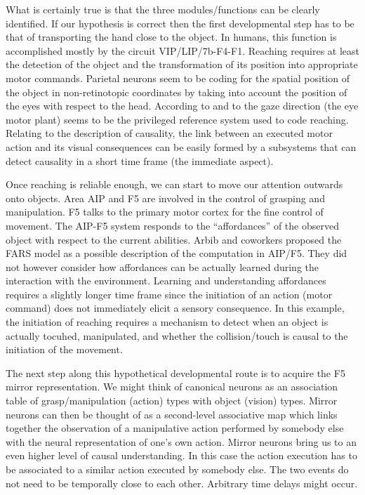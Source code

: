 What is certainly true is that the three modules/functions can be 
clearly identified. If our hypothesis is correct then 
the first developmental step has to be that of transporting the hand 
close to the object. In humans, this function is accomplished mostly by the
circuit VIP/LIP/7b-F4-F1. Reaching requires at least the detection of
the object and the transformation of its position into appropriate 
motor commands. Parietal neurons seem to be coding for the spatial
position of the object in non-retinotopic coordinates by taking
into account the position of the eyes with respect to the head. 
According to \cite{pouget-ducom-torri-bavelier-2002} and 
to \cite{flanders-daghestani-berthoz-1999} the 
gaze direction (the eye motor plant) seems to be the privileged
reference system used to code reaching. 
Relating to the description of causality, the link between an executed
motor action and its visual consequences can be easily formed by 
a subsystems that can detect causality in a short time frame (the immediate
aspect).


Once reaching is reliable enough, we can start to move our attention 
outwards onto objects. Area AIP and F5 are involved in the
control of grasping and manipulation. F5 talks to the 
primary motor cortex for the fine control of movement. 
The AIP-F5 system responds to the ``affordances'' of the observed 
object with respect to the
current abilities.
Arbib and coworkers \cite{fagg-arbib-1998} proposed 
the FARS model as a possible description of the computation in AIP/F5. 
They did not however consider how affordances can be 
actually learned during the interaction with the environment. 
Learning and understanding affordances requires a slightly longer 
time frame since the initiation of an action (motor command) does not
immediately elicit a sensory consequence. In this example, the initiation
of reaching requires a mechanism to detect when an object is actually 
tocuhed, manipulated, and whether the collision/touch is causal to the
initiation of the movement.

The next step along this hypothetical developmental route is to 
acquire the F5 mirror representation. We might think of canonical neurons as
an association table of grasp/manipulation (action) types with object
(vision) types.  Mirror neurons can then be thought of as a 
second-level associative map which links together the observation of 
a manipulative action performed by somebody else with the neural 
representation of one's own action.
Mirror neurons bring us to an even higher level of causal 
understanding. In this case the action execution has to be associated
to a similar action executed by somebody else. The two events
do not need to be temporally close to each other. Arbitrary time delays
might occur.

